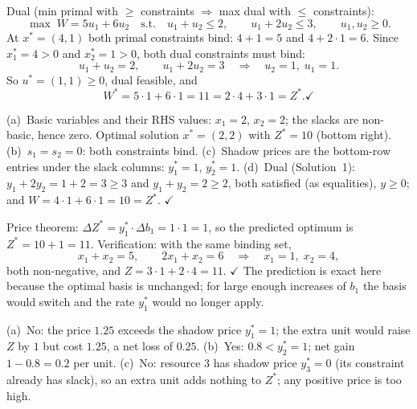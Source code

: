 \begin{solutions}
  \item Dual (min primal with $\ge$ constraints $\Rightarrow$ max dual
        with $\le$ constraints):
        \[
          \max\; W=5u_{1}+6u_{2}
          \quad\text{s.t.}\quad
          u_{1}+u_{2}\le 2,\qquad u_{1}+2u_{2}\le 3,\qquad
          u_{1},u_{2}\ge 0 .
        \]
        At $x^{*}=(4,1)$ both primal constraints bind:
        $4+1=5$ and $4+2\cdot 1=6$. Since $x_{1}^{*}=4>0$ and
        $x_{2}^{*}=1>0$, both dual constraints must bind:
        \[
          u_{1}+u_{2}=2,\qquad u_{1}+2u_{2}=3
          \quad\Longrightarrow\quad u_{2}=1,\; u_{1}=1 .
        \]
        So $u^{*}=(1,1)\ge 0$, dual feasible, and
        \[
          W^{*}=5\cdot 1+6\cdot 1=11
          =2\cdot 4+3\cdot 1=Z^{*}. \checkmark
        \]

  \item (a)~Basic variables and their RHS values: $x_{1}=2$, $x_{2}=2$;
        the slacks are non-basic, hence zero. Optimal solution
        $x^{*}=(2,2)$ with $Z^{*}=10$ (bottom right).
        (b)~$s_{1}=s_{2}=0$: both constraints bind.
        (c)~Shadow prices are the bottom-row entries under the slack
        columns: $y_{1}^{*}=1$, $y_{2}^{*}=1$.
        (d)~Dual (Solution~1): $y_{1}+2y_{2}=1+2=3\ge 3$ and
        $y_{1}+y_{2}=2\ge 2$, both satisfied (as equalities), $y\ge 0$;
        and $W=4\cdot 1+6\cdot 1=10=Z^{*}$. $\checkmark$

  \item Price theorem: $\Delta Z^{*}=y_{1}^{*}\cdot\Delta b_{1}
        =1\cdot 1=1$, so the predicted optimum is $Z^{*}=10+1=11$.
        Verification: with the same binding set,
        \[
          x_{1}+x_{2}=5,\qquad 2x_{1}+x_{2}=6
          \quad\Longrightarrow\quad x_{1}=1,\; x_{2}=4 ,
        \]
        both non-negative, and $Z=3\cdot 1+2\cdot 4=11$. $\checkmark$
        The prediction is exact here because the optimal basis is
        unchanged; for large enough increases of $b_{1}$ the basis would
        switch and the rate $y_{1}^{*}$ would no longer apply.

  \item (a)~No: the price $1.25$ exceeds the shadow price
        $y_{1}^{*}=1$; the extra unit would raise $Z$ by $1$ but cost
        $1.25$, a net loss of $0.25$.
        (b)~Yes: $0.8<y_{2}^{*}=1$; net gain $1-0.8=0.2$ per unit.
        (c)~No: resource 3 has shadow price $y_{3}^{*}=0$ (its constraint
        already has slack), so an extra unit adds nothing to $Z^{*}$;
        any positive price is too high.


\end{solutions}
